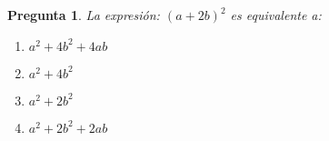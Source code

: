 \documentclass{article}
\newtheorem {Pregunta}{Pregunta}
\newenvironment{pregunta}{\begin{Pregunta} \rm}{\rm\end{Pregunta}}
\newenvironment{opciones}{\begin{enumerate}
    \renewcommand{\theenumi}{\Alph{enumi}}}
{\end{enumerate}\renewcommand{\theenumi}{\roman{enumi}}}
\begin{document}
\begin{pregunta}
La expresi\'on:
$(a+2b)^2$ es equivalente a:

\begin{opciones}
\item $a^2+4b^2+4ab$  %
\item $a^2+4b^2$      
\item $a^2+2b^2$      
\item $a^2+2b^2 +2ab$ 
\end{opciones}

\end{pregunta}
\end{document}
